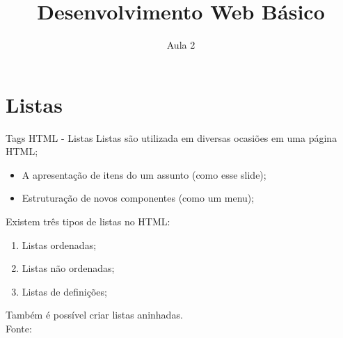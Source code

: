 \documentclass{beamer}
\title{Desenvolvimento Web Básico}
\subtitle{Aula 2}
\date{}
\begin{document}
\frame{
 \titlepage
}



\section{Listas}
\begin{frame}{Tags HTML - Listas}
  Listas são utilizada em diversas ocasiões em uma página HTML;
  \begin{itemize}
   \item A apresentação de itens do um assunto (como esse slide);
   \item Estruturação de novos componentes (como um menu);
  \end{itemize}
   Existem três tipos de listas no HTML:
  \begin{enumerate}
   \item Listas ordenadas;
    \item Listas não ordenadas;
    \item Listas de definições;
 \end{enumerate}
 Também é possível criar listas aninhadas.\\
 \tiny{Fonte: \cite{miletto2014desenvolvimento}}
\end{frame}
\end{document}
